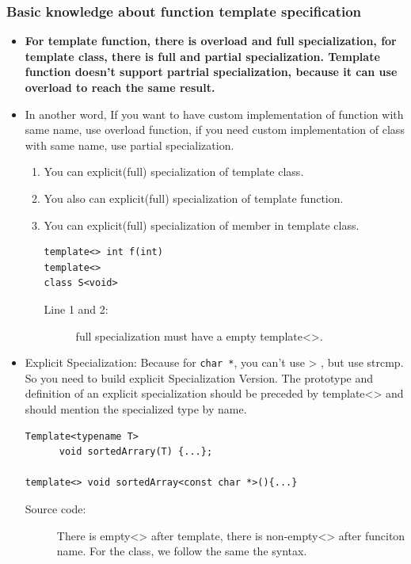 \documentclass[a4paper,11pt,twoside]{book}
\begin{document}
\subsubsection{Basic knowledge about function template specification}
\begin{itemize}

    \item \textbf{For template function, there is overload and full specialization, for template class, there is full and partial specialization. Template function doesn't support partrial specialization, because it can use overload to reach the same result.} 

    \item In another word, If you want to have custom implementation of function with same name, use overload function, if you need  custom implementation of class with same name, use partial specialization.

    \begin{enumerate}
	\item You can explicit(full) specialization of template class. 
	\item You also can explicit(full) specialization of template function. 
	\item You can explicit(full) specialization of member in template class. 
\begin{lstlisting}
template<> int f(int)
template<> 
class S<void>
\end{lstlisting}
\begin{description}
	\item[Line 1 and 2:] full specialization must have a empty template<>.
\end{description}
	\end{enumerate}


    \item Explicit Specialization: Because for \texttt{char *}, you can't use > , but use strcmp.  So you need to build explicit Specialization Version. The prototype and definition of an explicit specialization should be preceded by template<> and should mention the specialized type by name.
	
\begin{lstlisting}[numbers=none]
Template<typename T>
      void sortedArrary(T) {...};

template<> void sortedArray<const char *>(){...}
\end{lstlisting}
\begin{description}
	\item[Source code:] There is empty<> after template, there is non-empty<> after funciton name. For the class, we follow the same the syntax.
\end{description}


\end{itemize}
\end{document}
